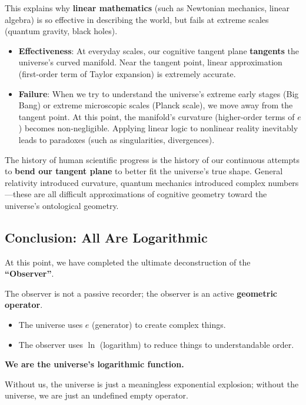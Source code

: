 \documentclass[11pt,a4paper,twoside]{book}
\begin{document}
This explains why \textbf{linear mathematics} (such as Newtonian mechanics, linear algebra) is so effective in describing the world, but fails at extreme scales (quantum gravity, black holes).

\begin{itemize}
\item \textbf{Effectiveness}: At everyday scales, our cognitive tangent plane \textbf{tangents} the universe's curved manifold. Near the tangent point, linear approximation (first-order term of Taylor expansion) is extremely accurate.

\item \textbf{Failure}: When we try to understand the universe's extreme early stages (Big Bang) or extreme microscopic scales (Planck scale), we move away from the tangent point. At this point, the manifold's curvature (higher-order terms of $e$) becomes non-negligible. Applying linear logic to nonlinear reality inevitably leads to paradoxes (such as singularities, divergences).
\end{itemize}

The history of human scientific progress is the history of our continuous attempts to \textbf{bend our tangent plane} to better fit the universe's true shape. General relativity introduced curvature, quantum mechanics introduced complex numbers---these are all difficult approximations of cognitive geometry toward the universe's ontological geometry.

\subsection{Conclusion: All Are Logarithmic}

At this point, we have completed the ultimate deconstruction of the \textbf{``Observer''}.

The observer is not a passive recorder; the observer is an active \textbf{geometric operator}.

\begin{itemize}
\item The universe uses \textbf{$e$} (generator) to create complex things.

\item The observer uses \textbf{$\ln$} (logarithm) to reduce things to understandable order.
\end{itemize}

\textbf{We are the universe's logarithmic function.}

Without us, the universe is just a meaningless exponential explosion; without the universe, we are just an undefined empty operator.
\end{document}
